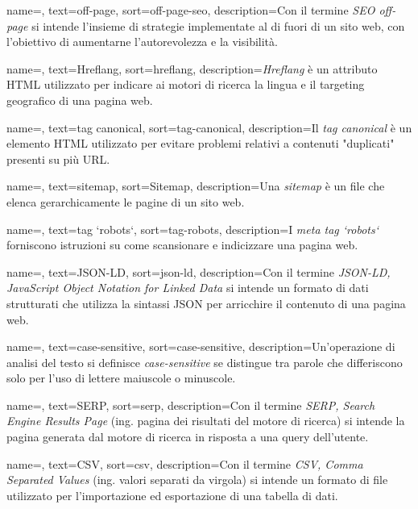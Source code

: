  {
    name=,
    text=off-page,
    sort=off-page-seo,
    description={Con il termine \emph{SEO off-page} si intende l'insieme di strategie implementate al di fuori di un sito web, con l'obiettivo di aumentarne l'autorevolezza e la visibilità.}
}

 {
    name=,
    text=Hreflang,
    sort=hreflang,
    description={\emph{Hreflang} è un attributo HTML utilizzato per indicare ai motori di ricerca la lingua e il targeting geografico di una pagina web.}
}

 {
    name=,
    text=tag canonical,
    sort=tag-canonical,
    description={Il \emph{tag canonical} è un elemento HTML utilizzato per evitare problemi relativi a contenuti "duplicati" presenti su più URL.}
}

 {
    name=,
    text=sitemap,
    sort=Sitemap,
    description={Una \emph{sitemap} è un file che elenca gerarchicamente le pagine di un sito web.}
}

 {
    name=,
    text=tag `robots`,
    sort=tag-robots,
    description={I \emph{meta tag `robots`} forniscono istruzioni su come scansionare e indicizzare una pagina web.}
}

 {
    name=,
    text=JSON-LD,
    sort=json-ld,
    description={Con il termine \emph{JSON-LD, JavaScript Object Notation for Linked Data} si intende un formato di dati strutturati che utilizza la sintassi JSON per arricchire il contenuto di una pagina web.}
}

 {
    name=,
    text=case-sensitive,
    sort=case-sensitive,
    description={Un'operazione di analisi del testo si definisce \emph{case-sensitive} se distingue tra parole che differiscono solo per l'uso di lettere maiuscole o minuscole.}
}

 {
    name=,
    text=SERP,
    sort=serp,
    description={Con il termine \emph{SERP, Search Engine Results Page} (ing. pagina dei risultati del motore di ricerca) si intende la pagina generata dal motore di ricerca in risposta a una query dell'utente.}
}

 {
    name=,
    text=CSV,
    sort=csv,
    description={Con il termine \emph{CSV, Comma Separated Values} (ing. valori separati da virgola) si intende un formato di file utilizzato per l'importazione ed esportazione di una tabella di dati.}
}

